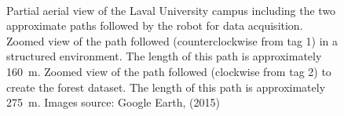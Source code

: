 \begin{figure}[H]
    \centering
    \\ \vspace{3mm}
     \hspace{2mm}
    \caption{\protect{} Partial aerial view of the Laval University campus including the two approximate paths followed by the robot for data acquisition. \protect{} Zoomed view of the path followed (counterclockwise from tag 1) in a structured environment. The length of this path is approximately \SI{160}{\meter}. \protect{} Zoomed view of the path followed (clockwise from tag 2) to create the forest dataset. The length of this path is approximately \SI{275}{\meter}. Images source: Google Earth, (2015)}
    \label{fig:chap_slam_path}
\end{figure}

